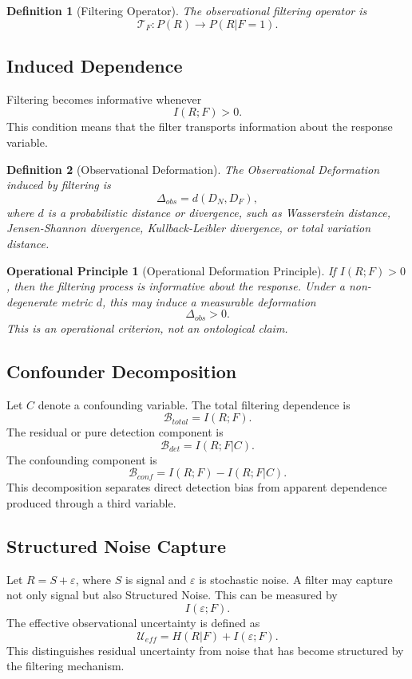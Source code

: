 \documentclass[11pt]{article}
\newtheorem{definition}{Definition}
\newtheorem{principle}{Operational Principle}
\begin{document}
\begin{definition}[Filtering Operator]
The observational filtering operator is
\[
\mathcal{T}_F:P(R)\rightarrow P(R|F=1).
\]
\end{definition}

\subsection{Induced Dependence}

Filtering becomes informative whenever
\[
I(R;F)>0.
\]
This condition means that the filter transports information about the response variable.

\begin{definition}[Observational Deformation]
The Observational Deformation induced by filtering is
\[
\Delta_{obs}=d(D_N,D_F),
\]
where $d$ is a probabilistic distance or divergence, such as Wasserstein distance, Jensen-Shannon divergence, Kullback-Leibler divergence, or total variation distance.
\end{definition}

\begin{principle}[Operational Deformation Principle]
If $I(R;F)>0$, then the filtering process is informative about the response. Under a non-degenerate metric $d$, this may induce a measurable deformation
\[
\Delta_{obs}>0.
\]
This is an operational criterion, not an ontological claim.
\end{principle}

\subsection{Confounder Decomposition}

Let $C$ denote a confounding variable. The total filtering dependence is
\[
\mathcal{B}_{total}=I(R;F).
\]
The residual or pure detection component is
\[
\mathcal{B}_{det}=I(R;F|C).
\]
The confounding component is
\[
\mathcal{B}_{conf}=I(R;F)-I(R;F|C).
\]
This decomposition separates direct detection bias from apparent dependence produced through a third variable.

\subsection{Structured Noise Capture}

Let $R=S+\varepsilon$, where $S$ is signal and $\varepsilon$ is stochastic noise. A filter may capture not only signal but also Structured Noise. This can be measured by
\[
I(\varepsilon;F).
\]
The effective observational uncertainty is defined as
\[
\mathcal{U}_{eff}=H(R|F)+I(\varepsilon;F).
\]
This distinguishes residual uncertainty from noise that has become structured by the filtering mechanism.
\end{document}
